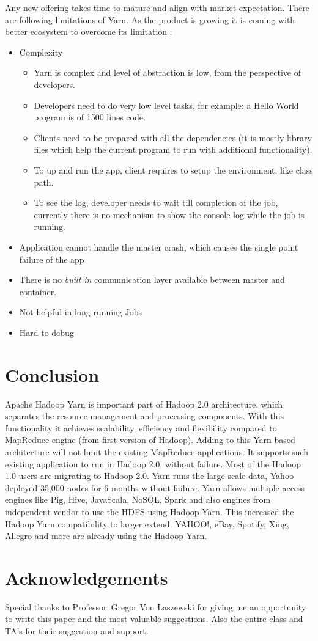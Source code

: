\documentclass[9pt,twocolumn,twoside]{../../styles/osajnl}
\begin{document}
	Any new offering takes time to mature and align with market expectation. There are following limitations of Yarn. As the product is growing it is coming with better ecosystem to overcome its limitation \cite{www-5}: 
\begin{itemize}	
	
	\item Complexity  
		\begin{itemize}	
			\item Yarn is complex and level of abstraction is low, from the perspective of developers. 
			\item Developers need to do very low level tasks, for example:  a Hello World program is of 1500 lines code.
			\item Clients need to be prepared with all the dependencies (it is mostly library files which help the current program to run with additional functionality).
			\item To up and run the app, client requires to setup the environment, like class path. 
			\item To see the log, developer needs to wait till completion of the job, currently there is no mechanism to show the console log while the job is running.	
		\end{itemize}		
		

	\item Application cannot handle the master crash, which causes the single point failure of the app
	\item There is no \textit{built in} communication layer available between master and container.
	\item Not helpful in long running Jobs
	\item Hard to debug
	
\end{itemize}
	
\section{Conclusion}

Apache Hadoop Yarn is important part of Hadoop 2.0 architecture, which separates the resource management and processing components. With this functionality it achieves scalability, efficiency and flexibility compared to MapReduce engine (from first version of Hadoop). Adding to this Yarn based architecture will not limit the existing MapReduce applications. It supports such existing application to run in Hadoop 2.0, without failure. Most of the Hadoop 1.0 users are migrating to Hadoop 2.0. Yarn runs the large scale data, Yahoo deployed 35,000 nodes for 6 months without failure. Yarn allows multiple access engines like Pig, Hive, JavaScala, NoSQL, Spark and also engines from independent vendor to use the HDFS using Hadoop Yarn. This increased the Hadoop Yarn compatibility to larger extend. YAHOO!, eBay, Spotify, Xing, Allegro and more are already using the Hadoop Yarn.


\section*{Acknowledgements}

Special thanks to Professor Gregor Von Laszewski for giving me an opportunity to write this paper and the most valuable suggestions. Also the entire class and TA’s for their suggestion and support.



 
\end{document}
